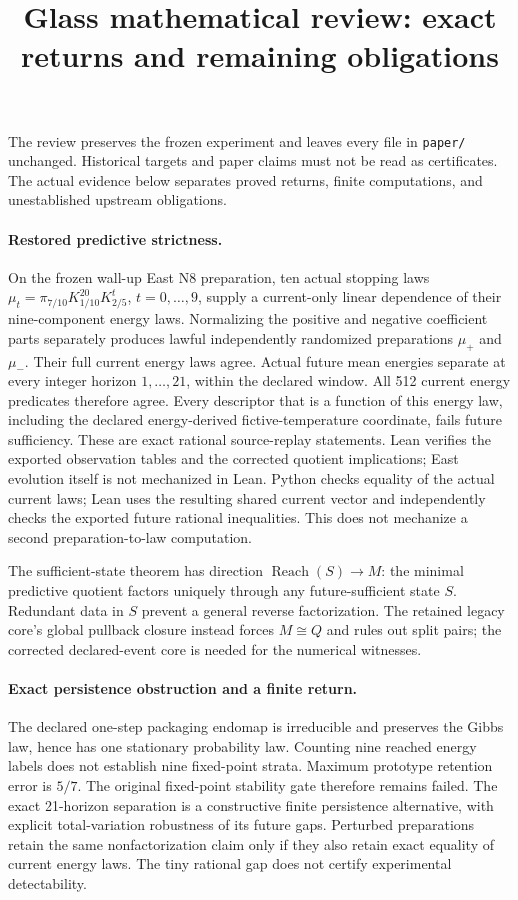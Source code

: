 \documentclass{article}
\begin{document}
\title{Glass mathematical review: exact returns and remaining obligations}
\author{}\date{}\maketitle

The review preserves the frozen experiment and leaves every file in
\texttt{paper/} unchanged. Historical targets and paper claims must not be
read as certificates. The actual evidence below separates proved returns,
finite computations, and unestablished upstream obligations.

\paragraph{Restored predictive strictness.}
On the frozen wall-up East N8 preparation, ten actual stopping laws
$\mu_t=\pi_{7/10}K_{1/10}^{20}K_{2/5}^{t}$, $t=0,\ldots,9$, supply a
current-only linear dependence of their nine-component energy laws.
Normalizing the positive and negative coefficient parts separately produces
lawful independently randomized preparations $\mu_+$ and $\mu_-$.
Their full current energy laws agree. Actual future mean energies separate
at every integer horizon $1,\ldots,21$, within the declared window.
All 512 current energy predicates therefore agree. Every descriptor that
is a function of this energy law, including the declared energy-derived
fictive-temperature coordinate, fails future sufficiency. These are exact
rational source-replay statements. Lean verifies the exported observation
tables and the corrected quotient implications; East evolution itself is
not mechanized in Lean.
Python checks equality of the actual current laws; Lean uses the resulting
shared current vector and independently checks the exported future rational
inequalities. This does not mechanize a second preparation-to-law computation.

The sufficient-state theorem has direction
$\operatorname{Reach}(S)\longrightarrow M$: the minimal predictive quotient
factors uniquely through any future-sufficient state $S$. Redundant data
in $S$ prevent a general reverse factorization. The retained legacy core's
global pullback closure instead forces $M\cong Q$ and rules out split pairs;
the corrected declared-event core is needed for the numerical witnesses.

\paragraph{Exact persistence obstruction and a finite return.}
The declared one-step packaging endomap is irreducible and preserves the
Gibbs law, hence has one stationary probability law. Counting nine reached
energy labels does not establish nine fixed-point strata. Maximum prototype
retention error is $5/7$. The original fixed-point stability gate therefore
remains failed. The exact 21-horizon separation is a constructive finite
persistence alternative, with explicit total-variation robustness of its
future gaps. Perturbed preparations retain the same nonfactorization claim
only if they also retain exact equality of current energy laws. The tiny
rational gap does not certify experimental detectability.
\end{document}
